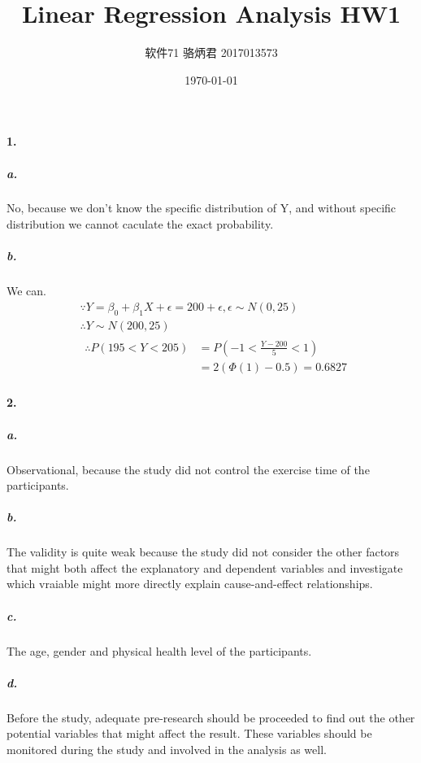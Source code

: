\documentclass[UTF8]{ctexart}
\title{Linear Regression Analysis HW1}
\author{软件71 骆炳君 2017013573}
\date{\today}
\begin{document}
\maketitle
{}

\paragraph{1.}
\subparagraph{a.}
No, because we don't know the specific distribution of Y, and without specific distribution we cannot caculate the exact probability.

\subparagraph{b.}
We can.
\begin{align*}
    &\because Y=\beta_0+\beta_1X+\epsilon=200+\epsilon, \epsilon\sim N(0,25)\\
    &\therefore Y\sim N(200,25)\\
    &
    \begin{aligned}
        \therefore P(195<Y<205)&=P(-1<\frac{Y-200}{5}<1)\\
        &=2(\Phi(1)-0.5)=0.6827
    \end{aligned}
\end{align*}

\paragraph{2.}
\subparagraph{a.}
Observational, because the study did not control the exercise time of the participants.

\subparagraph{b.}
The validity is quite weak because the study did not consider the other factors that might both affect the explanatory and dependent variables and investigate which vraiable might more directly explain cause-and-effect relationships.

\subparagraph{c.}
The age, gender and physical health level of the participants.

\subparagraph{d.}
Before the study, adequate pre-research should be proceeded to find out the other potential variables that might affect the result. These variables should be monitored during the study and involved in the analysis as well.
\end{document}
